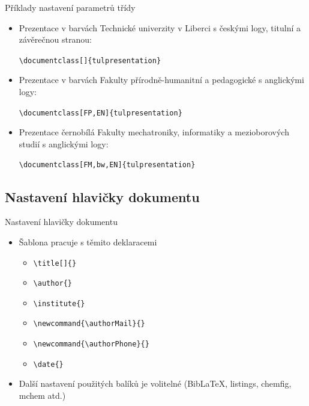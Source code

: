 \documentclass[TUL,aspect169]{tulpresentation} %
\makeatletter
\newcommand{\authorMail}{jmeno.prijmeni@tul.cz}
\newcommand{\authorPhone}{+420 485 35x xxx}
\makeatother
\begin{document}
\begin{frame}[fragile]{Příklady nastavení parametrů třídy}
  \begin{itemize}
    \item Prezentace v barvách Technické univerzity v Liberci s českými logy, titulní a závěrečnou stranou:

    \verb|\documentclass[]{tulpresentation}|

    \item Prezentace v barvách Fakulty přírodně-humanitní a pedagogické s anglickými logy:
    
    \verb|\documentclass[FP,EN]{tulpresentation}|
    
    \item Prezentace černobílá Fakulty mechatroniky, informatiky a mezioborových studií s anglickými logy:

    \verb|\documentclass[FM,bw,EN]{tulpresentation}|
  \end{itemize}
\end{frame}

\subsection{Nastavení hlavičky dokumentu}
\begin{frame}[fragile]{Nastavení hlavičky dokumentu}
  \begin{itemize}
    \item Šablona pracuje s těmito deklaracemi
    \begin{itemize}
        \item \verb|\title[]{}|
        \item \verb|\author{}|
        \item \verb|\institute{}|
        \item \verb|\newcommand{\authorMail}{}|
        \item \verb|\newcommand{\authorPhone}{}|
        \item \verb|\date{}|
    \end{itemize} 
    \item Další nastavení použitých balíků je volitelné (Bib\LaTeX, listings, chemfig, mchem atd.)    
  \end{itemize}
\end{frame}
\end{document}

